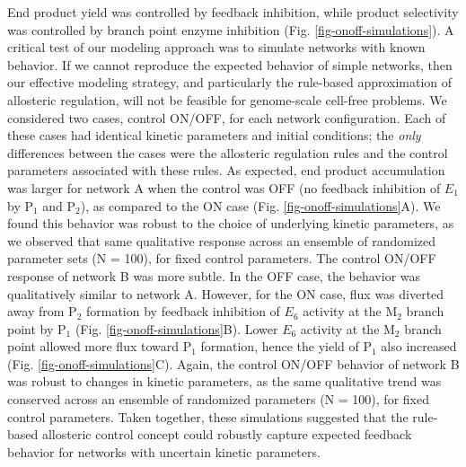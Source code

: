 \documentclass[12pt]{article}
\begin{document}
End product yield was controlled by feedback inhibition, while product selectivity was controlled by branch point enzyme inhibition (Fig. \ref{fig-onoff-simulations}). 
A critical test of our modeling approach was to simulate networks with known behavior. 
If we cannot reproduce the expected behavior of simple networks, then our effective modeling strategy, and particularly the rule-based approximation of allosteric regulation, will not be feasible for genome-scale cell-free problems. We considered two cases, control ON/OFF, for each network configuration. 
Each of these cases had identical kinetic parameters and initial conditions; the \textit{only} differences between the cases were the allosteric regulation rules and the control parameters associated with these rules. 
As expected, end product accumulation was larger for network A when the control was OFF (no feedback inhibition of $E_{1}$ by P$_{1}$ and P$_{2}$),
as compared to the ON case (Fig. \ref{fig-onoff-simulations}A). 
We found this behavior was robust to the choice of underlying kinetic parameters, as we observed that same qualitative response across an ensemble of randomized parameter sets (N = 100), for fixed control parameters. 
The control ON/OFF response of network B was more subtle. 
In the OFF case, the behavior was qualitatively similar to network A. 
However, for the ON case, flux was diverted away from P$_{2}$ formation by feedback inhibition of $E_{6}$ activity at the M$_{2}$ branch point by P$_{1}$ (Fig. \ref{fig-onoff-simulations}B). 
Lower $E_{6}$ activity at the M$_{2}$ branch point allowed more flux toward P$_{1}$ formation, hence the yield of P$_{1}$ also increased (Fig. \ref{fig-onoff-simulations}C). 
Again, the control ON/OFF behavior of network B was robust to changes in kinetic parameters, as the same qualitative trend was conserved across an ensemble of randomized parameters (N = 100), for fixed control parameters. 
Taken together, these simulations suggested that the rule-based allosteric control concept could robustly capture expected feedback behavior for networks with uncertain kinetic parameters.
\end{document}
